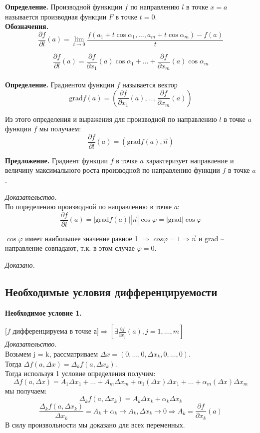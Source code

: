 \documentclass[a4paper,14pt]{article} %
\begin{document}
	 \textbf{Определение.} Производной функкции $f$ по направлению $l$ в точке $x = a$ называется производная функции $F$ в точке $t = 0$.\\
	 
	 \textbf{Обозначения.} 
	 \[\frac{\partial f}{\partial l}(a) = \lim\limits_{t \to 0} \frac{f(a_1 + t\cos\alpha_1, \ldots, a_m + t\cos\alpha_m) - f(a)}{t}\]
	 
	 \[\frac{\partial f}{\partial l}(a) = \frac{\partial f}{\partial x_1}(a)\cos\alpha_1 + \ldots + \frac{\partial f}{\partial x_m}(a)\cos\alpha_m\]\\
	 
	 \textbf{Определение.} Градиентом функции $f$ называется вектор \[\mathrm{grad}{f(a)} = (\frac{\partial f}{\partial x_1}(a), \ldots, \frac{\partial f}{\partial x_m}(a))\]
	 
	 Из этого определения и выражения для производной по направлению $l$ в точке $a$ функции $f$ мы получаем:
	 \[\frac{\partial f}{\partial l}(a) = (\mathrm{grad}{f(a), \vec{n}})\]
	 
	 \textbf{Предложение.}
	 Градиент функции $f$ в точке $a$ характеризует направление и величину максимального роста производной по направлению функции $f$ в точке $a$.
	 
	 \textit{Доказательство.}\\
	 По определению производной по направлению в точке $a$:
	 \[\frac{\partial f}{\partial l}(a) = |\mathrm{grad}{f(a)}| |\vec{n}|\cos\varphi = |\mathrm{grad}|\cos\varphi\]
	 
	 $\cos\varphi$ имеет наибольшее значение равное 1 $\Rightarrow$
	 $cos\varphi = 1 \Rightarrow \vec{n}$ и $\mathrm{grad}$ -- направление совпадают, т.к. в этом случае $\varphi = 0$.
	 
	 \textit{Доказано.}
	 \subsection*{Необходимые условия дифференцируемости}
	 
	 \textbf{Необходимое условие 1.}
	 
	 $[f$ дифференцируема в точке а$] \Rightarrow [\exists \frac{\partial f}{\partial x_j}(a), j = 1, \ldots, m]$\\
	 
	 \textit{Доказательство.}\\
	 Возьмем j = k, рассматриваем $\Delta x = (0, \ldots, 0, \Delta x_k, 0, \ldots, 0)$. \\	
	 Тогда $\Delta f(a, \Delta x) = \Delta_k f(a, \Delta x_k)$. \\
	 Тогда используя 1 условие определения получим:	
	 \[\Delta f(a, \Delta x) = A_1 \Delta x_1 + \ldots + A_m \Delta x_m + \alpha_1(\Delta x) \Delta x_1 + \ldots + \alpha_m (\Delta x)\Delta x_m\] 
	 мы получаем: 
	 \[\Delta_k f(a, \Delta x_k) = A_k\Delta x_k + \alpha_k\Delta x_k\]
	 \[\frac{\Delta_k f(a, \Delta x_k)}{\Delta x_k} = A_k + \alpha_k \to A_k, \Delta x_k \to 0 \Rightarrow A_k = \frac{\partial f}{\partial x_k} (a)\]
	 В силу произвольности мы доказано для всех переменных.
	 
\end{document}
